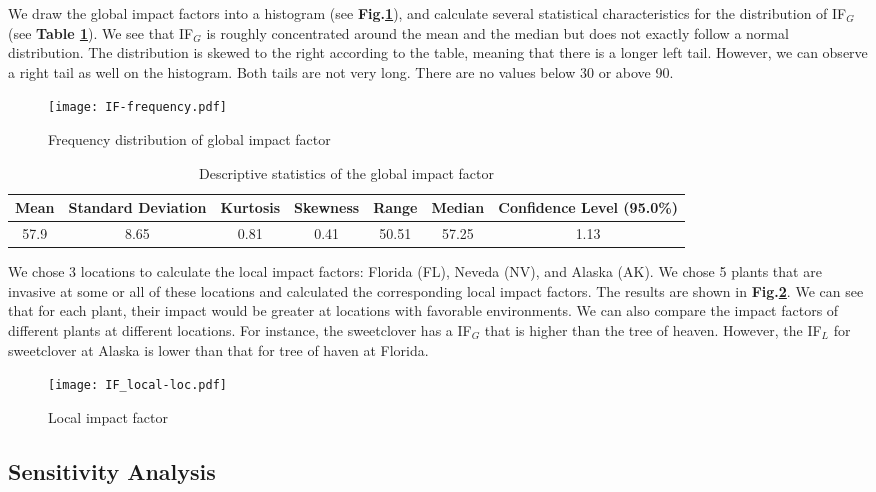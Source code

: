 \documentclass[12pt]{article}
\begin{document}
		We draw the global impact factors into a histogram (see \textbf{Fig.\ref{fig:freqIF}}), and calculate several statistical characteristics for the distribution of IF$_G$ (see \textbf{Table \ref{tb:IFDistribution}}).  We see that IF$_G$ is roughly concentrated around the mean and the median but does not exactly follow a normal distribution.  The distribution is skewed to the right according to the table, meaning that there is a longer left tail.  However, we can observe a right tail as well on the histogram.  Both tails are not very long.  There are no values below 30 or above 90.
		
		\begin{figure}[htbp]
			\centering
			\texttt{[image: IF-frequency.pdf]}
			\caption{Frequency distribution of global impact factor}
			\label{fig:freqIF}
		\end{figure}
		
		{
			\fontsize{10}{14}\selectfont
			{
				\begin{longtable}{ccccccc}
					\caption{Descriptive statistics of the global impact factor}
					\label{tb:IFDistribution}\\
					
					\toprule
					Mean&Standard Deviation&Kurtosis&Skewness&Range&Median&Confidence Level (95.0\%)\\
					\toprule
					57.9&8.65&0.81&0.41&50.51&57.25&1.13\\
					\bottomrule
				\end{longtable}
			}
		}
		
		We chose 3 locations to calculate the local impact factors: Florida (FL), Neveda (NV), and Alaska (AK).  We chose 5 plants that are invasive at some or all of these locations and calculated the corresponding local impact factors.  The results are shown in \textbf{Fig.\ref{fig:IFLocal}}.  We can see that for each plant, their impact would be greater at locations with favorable environments.  We can also compare the impact factors of different plants at different locations.  For instance, the sweetclover has a IF$_G$ that is higher than the tree of heaven.  However, the IF$_L$ for sweetclover at Alaska is lower than that for tree of haven at Florida.  
		
		\begin{figure}[htbp]
			\centering
			\texttt{[image: IF\_local-loc.pdf]}
			\caption{Local impact factor}
			\label{fig:IFLocal}
		\end{figure}

	\subsection{Sensitivity Analysis}
	
\end{document}
